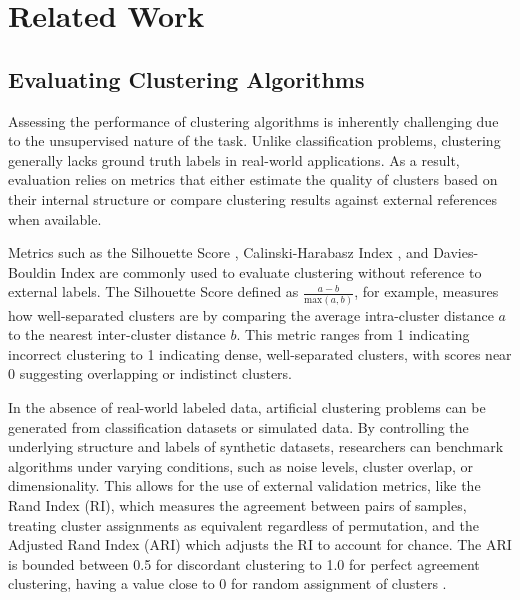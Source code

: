 \section{Related Work}
\label{related-work}




\subsection{Evaluating Clustering Algorithms}


Assessing the performance of clustering algorithms is inherently challenging due to the unsupervised nature of the task. Unlike classification problems, clustering generally lacks ground truth labels in real-world applications. As a result, evaluation relies on metrics that either estimate the quality of clusters based on their internal structure or compare clustering results against external references when available.

Metrics such as the Silhouette Score \cite{silhouette1987}, Calinski-Harabasz Index \cite{calinsky1974}, and Davies-Bouldin Index \cite{davies1979} are commonly used to evaluate clustering without reference to external labels. The Silhouette Score defined as $\frac{a-b}{\text{max}\left(a,b\right)}$, for example, measures how well-separated clusters are by comparing the average intra-cluster distance $a$ to the nearest inter-cluster distance $b$. This metric ranges from \text{-}1 indicating incorrect clustering to 1 indicating dense, well-separated clusters, with scores near 0 suggesting overlapping or indistinct clusters.

In the absence of real-world labeled data, artificial clustering problems can be generated from classification datasets or simulated data. By controlling the underlying structure and labels of synthetic datasets, researchers can benchmark algorithms under varying conditions, such as noise levels, cluster overlap, or dimensionality. This allows for the use of external validation metrics, like the Rand Index (RI), which measures the agreement between pairs of samples, treating cluster assignments as equivalent regardless of permutation, and the Adjusted Rand Index (ARI) which adjusts the RI to account for chance. The ARI is bounded between \text{-}0.5 for discordant clustering to 1.0 for perfect agreement clustering, having a value close to 0 for random assignment of clusters \cite{ari1985}.



